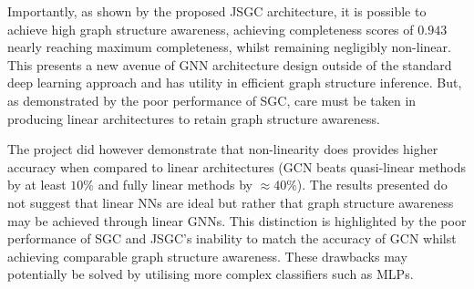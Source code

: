 Importantly, as shown by the proposed JSGC architecture, it is possible to achieve high graph structure awareness, achieving completeness scores of $0.943$ nearly reaching maximum completeness, whilst remaining negligibly non-linear.
This presents a new avenue of GNN architecture design outside of the standard deep learning approach and has utility in efficient graph structure inference.
But, as demonstrated by the poor performance of SGC, care must be taken in producing linear architectures to retain graph structure awareness.

The project did however demonstrate that non-linearity does provides higher accuracy when compared to linear architectures (GCN beats quasi-linear methods by at least $10\%$ and fully linear methods by $\approx 40\%$).
The results presented do not suggest that linear NNs are ideal but rather that graph structure awareness may be achieved through linear GNNs.
This distinction is highlighted by the poor performance of SGC and JSGC's inability to match the accuracy of GCN whilst achieving comparable graph structure awareness.
These drawbacks may potentially be solved by utilising more complex classifiers such as MLPs.

%
%

